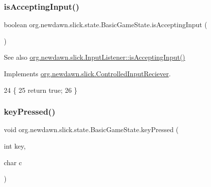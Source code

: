 \subsubsection{\texorpdfstring{is\+Accepting\+Input()}{isAcceptingInput()}}
{\footnotesize\ttfamily boolean org.\+newdawn.\+slick.\+state.\+Basic\+Game\+State.\+is\+Accepting\+Input (\begin{DoxyParamCaption}{ }\end{DoxyParamCaption})\hspace{0.3cm}{\ttfamily [inline]}}

\begin{DoxySeeAlso}{See also}
\mbox{\hyperlink{interfaceorg_1_1newdawn_1_1slick_1_1_controlled_input_reciever_a380186fb0c34c11c212b72fae8186dc7}{org.\+newdawn.\+slick.\+Input\+Listener\+::is\+Accepting\+Input()}} 
\end{DoxySeeAlso}


Implements \mbox{\hyperlink{interfaceorg_1_1newdawn_1_1slick_1_1_controlled_input_reciever_a380186fb0c34c11c212b72fae8186dc7}{org.\+newdawn.\+slick.\+Controlled\+Input\+Reciever}}.


\begin{DoxyCode}
24                                       \{
25         \textcolor{keywordflow}{return} \textcolor{keyword}{true};
26     \}
\end{DoxyCode}
\mbox{\label{classorg_1_1newdawn_1_1slick_1_1state_1_1_basic_game_state_adb2d3de92ca31d17f22d119f93164407}} 
\subsubsection{\texorpdfstring{key\+Pressed()}{keyPressed()}}
{\footnotesize\ttfamily void org.\+newdawn.\+slick.\+state.\+Basic\+Game\+State.\+key\+Pressed (\begin{DoxyParamCaption}\item[{int}]{key,  }\item[{char}]{c }\end{DoxyParamCaption})\hspace{0.3cm}{\ttfamily [inline]}}

